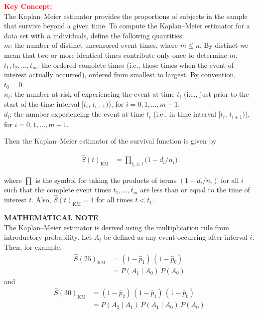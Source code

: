 \documentclass[
]{report}
\begin{document}
\textbf{\textcolor{red}{Key Concept:}}\\
\color{red}
The Kaplan--Meier estimator provides the proportions of subjects in the sample that survive beyond a given time. To compute the Kaplan--Meier estimator for a data set with \(n\) individuals, define the following quantities:\\
\(m\): the number of distinct uncensored event times, where \(m \le n\). By distinct we mean that two or more identical times contribute only once to determine \(m\).\\
\(t_1, t_2, \dots, t_m\): the ordered complete times (i.e., those times when the event of interest actually occurred), ordered from smallest to largest. By convention, \(t_0 = 0\).\\
\(n_i\): the number at risk of experiencing the event at time \(t_i\) (i.e., just prior to the start of the time interval \([t_i,\,t_{i+1})\)), for \(i = 0,1,\dots,m-1\).\\
\(d_i\): the number experiencing the event at time \(t_i\) (i.e., in time interval \([t_i,\,t_{i+1})\)), for \(i = 0,1,\dots,m-1\).

Then the Kaplan--Meier estimator of the survival function is given by

\begin{align}
\hat S(t)_{\mathrm{KM}} &= \prod_{t_i \le t} \bigl(1 - d_i/n_i\bigr)
\tag{9.2}
\end{align}

where \(\prod\) is the symbol for taking the products of terms \((1 - d_i/n_i)\) for all \(i\) such that the complete event times \(t_1,\dots,t_m\) are less than or equal to the time of interest \(t\). Also, \(\hat S(t)_{\mathrm{KM}} = 1\) for all times \(t < t_1\).
\color{black}
\normalsize

\large

\textbf{MATHEMATICAL NOTE}\\
The Kaplan--Meier estimator is derived using the multiplication rule from introductory probability. Let \(A_i\) be defined as any event occurring after interval \(i\). Then, for example,
\begin{align}
\hat S(25)_{\mathrm{KM}} &= (1 - \hat p_1)\,(1 - \hat p_0) \\
&= P(A_1 \mid A_0)\,P(A_0)
\end{align}
and
\begin{align}
\hat S(30)_{\mathrm{KM}} &= (1 - \hat p_2)\,(1 - \hat p_1)\,(1 - \hat p_0) \\
&= P(A_2 \mid A_1)\,P(A_1 \mid A_0)\,P(A_0)
\end{align}
\normalsize
\end{document}

